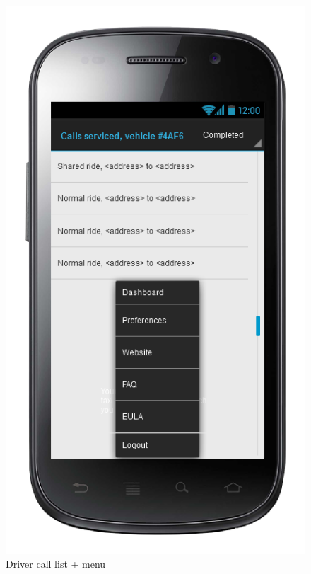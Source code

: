 \begin{figure} [h]
\centering
  	  \includegraphics[scale=0.5]{ui/Driver call list + menu.png}
\caption{Driver call list + menu}
    
	\end{figure}
